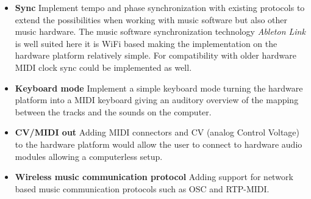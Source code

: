 \begin{itemize}
    \item \textbf{Sync} Implement tempo and phase synchronization with existing protocols to extend the possibilities when working with music software but also other music hardware. The music software synchronization technology \textit{Ableton Link} is well suited here it is WiFi based making the implementation on the hardware platform relatively simple. For compatibility with older hardware MIDI clock sync could be implemented as well.
    \item \textbf{Keyboard mode} Implement a simple keyboard mode turning the hardware platform into a MIDI keyboard giving an auditory overview of the mapping between the tracks and the sounds on the computer.
    \item \textbf{CV/MIDI out} Adding MIDI connectors and CV (analog Control Voltage) to the hardware platform would allow the user to connect to hardware audio modules allowing a computerless setup. 
    \item \textbf{Wireless music communication protocol} Adding support for network based music communication protocols such as OSC and RTP-MIDI.
\end{itemize}








